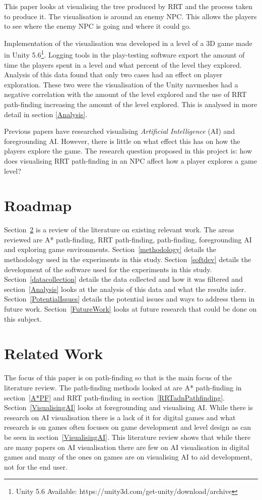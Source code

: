 \documentclass[journal]{IEEEtran}
\begin{document}
	This paper looks at visualising the tree produced by RRT and the process taken to produce it. The visualisation is around an enemy NPC. This allows the players to see where the enemy NPC is going and where it could go. 
	
	Implementation of the visualisation was developed in a level of a 3D game made in Unity 5.6\footnote[1]{Unity 5.6 Available: https://unity3d.com/get-unity/download/archive}. Logging tools in the play-testing software export the amount of time the players spent in a level and what percent of the level they explored. Analysis of this data found that only two cases had an effect on player exploration. These two were the visualisation of the Unity navmeshes had a negative correlation with the amount of the level explored and the use of RRT path-finding increasing the amount of the level explored. This is analysed in more detail in section \ref{Analysis}.
	
	Previous papers have researched visualising \textit{Artificial Intelligence} (AI) and foregrounding AI. However, there is little on what effect this has on how the players explore the game.
	The research question proposed in this project is: how does visualising RRT path-finding in an NPC affect how a player explores a game level?
	
	\section{Roadmap}
	Section~\ref{RelatedWork} is a review of the literature on existing relevant work. The areas reviewed are A* path-finding, RRT path-finding, path-finding, foregrounding AI and exploring game environments. 
	Section~\ref{methodology} details the methodology used in the experiments in this study. Section~\ref{softdev} details the development of the software used for the experiments in this study.
	Section~\ref{datacollection} details the data collected and how it was filtered and section~\ref{Analysis} looks at the analysis of this data and what the results infer. Section~\ref{PotentialIssues} details the potential issues and ways to address them in future work. Section~\ref{FutureWork} looks at future research that could be done on this subject. 
	
	\section{Related Work} \label{RelatedWork}
	The focus of this paper is on path-finding so that is the main focus of the literature review. The path-finding methods looked at are A* path-finding in section~\ref{A*PF} and RRT path-finding in section~\ref{RRTadnPathfinding}.  Section~\ref{VisualisingAI} looks at foregrounding and visualising AI. While there is research on AI visualisation there is a lack of it for digital games and what research is on games often focuses on game development and level design as can be seen in section~\ref{VisualisingAI}. 
	This literature review shows that while there are many papers on AI visualisation there are few on AI visualisation in digital games and many of the ones on games are on visualising AI to aid development, not for the end user.     
	
\end{document}
